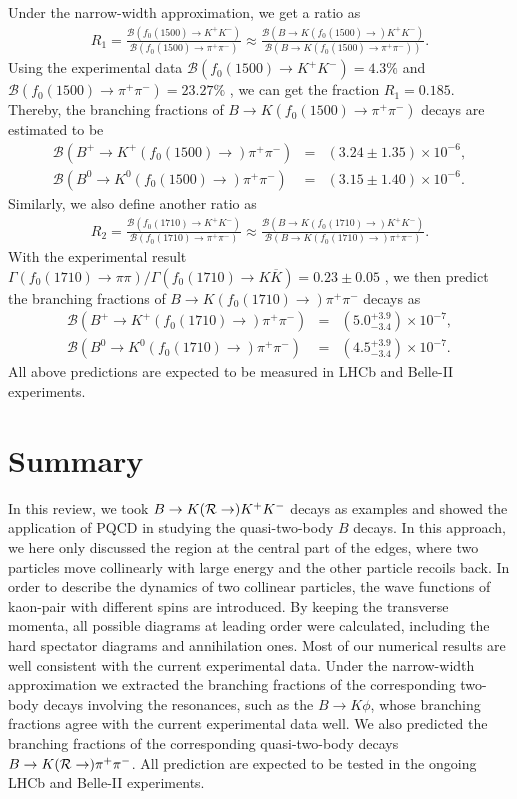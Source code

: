 \documentclass[11pt]{article}
\begin{document}
Under the narrow-width approximation, we get a  ratio as
\begin{eqnarray}
{R}_1=\frac{\mathcal{B}(f_0(1500)\to K^+K^-)}{\mathcal{B}(f_0(1500)\to \pi^+\pi^-)}\approx\frac{\mathcal{B}(B\to K(f_0(1500)\to) K^+K^-)}{\mathcal{B}(B \to K (f_0(1500)\to  \pi^+\pi^-))}.
\end{eqnarray}
Using the experimental data $\mathcal{B}(f_0(1500)\to K^+K^-)=4.3\%$ and $\mathcal{B}(f_0(1500)\to \pi^+\pi^-)=23.27\%$ \cite{Zyla:2020zbs}, we can get the fraction ${R}_1=0.185$. Thereby, the branching fractions of $B\to K(f_0(1500) \to  \pi^+ \pi^-)$ decays are estimated to be
 \begin{eqnarray}
 \mathcal{B}(B^{+}\to K^{+}(f_0(1500)\to)\pi^+\pi^-)&=&(3.24\pm 1.35)\times10^{-6},\\
 \mathcal{B}(B^{0}\to K^{0}(f_0(1500)\to) \pi^+\pi^-)&=&(3.15\pm1.40)\times10^{-6}.
\end{eqnarray}
Similarly, we also define another ratio as
\begin{eqnarray}
{R}_2=\frac{\mathcal{B}(f_0(1710)\to K^+K^-)}{\mathcal{B}(f_0(1710)\to \pi^+\pi^-)}\approx
\frac{\mathcal{B}(B\to K(f_0(1710)\to) K^+K^-)}{\mathcal{B}(B\to K(f_0(1710)\to) \pi^+\pi^-)}.
\end{eqnarray}
With the experimental result $\Gamma (f_0(1710) \to \pi \pi)/\Gamma(f_0(1710)\to K\overline{K})=0.23\pm0.05$ \cite{Zyla:2020zbs}, we then  predict the branching fractions of $B \to K (f_0(1710)\to )\pi^+\pi^-$ decays as
\begin{eqnarray}
 \mathcal{B}(B^{+}\to K^{+}(f_0(1710)\to)\pi^+\pi^-)
&=&(5.0^{+3.9}_{-3.4})\times10^{-7},\nonumber\\
 \mathcal{B}(B^{0}\to K^{0}(f_0(1710)\to)\pi^+\pi^-)
&=&(4.5^{+3.9}_{-3.4})\times10^{-7}.
\end{eqnarray}
All above  predictions are expected to be measured in LHCb and Belle-II experiments.
\section {Summary}\label{summary}
In this review, we took $B\to K({\cal R}\to) K^+K^-$ decays as examples and showed the application of PQCD in studying the quasi-two-body $B$ decays. In this approach, we here only discussed the region at the central part of the edges, where two particles move collinearly with large energy and the other particle recoils back. In order to describe the dynamics of two collinear particles, the wave functions of kaon-pair with different spins are introduced. By keeping the transverse momenta, all possible diagrams at leading order were calculated, including the hard spectator diagrams and annihilation ones. Most of our numerical results are well consistent with the current experimental data. Under the narrow-width approximation we extracted the branching fractions of the corresponding two-body decays involving the resonances, such as the $B \to K \phi $, whose branching fractions agree with the current experimental data well. We also predicted the branching fractions of the corresponding quasi-two-body decays $B\to K(\cal{R}\to) \pi^+\pi^-$. All prediction are expected to be tested in the ongoing LHCb and Belle-II experiments.
\end{document}
